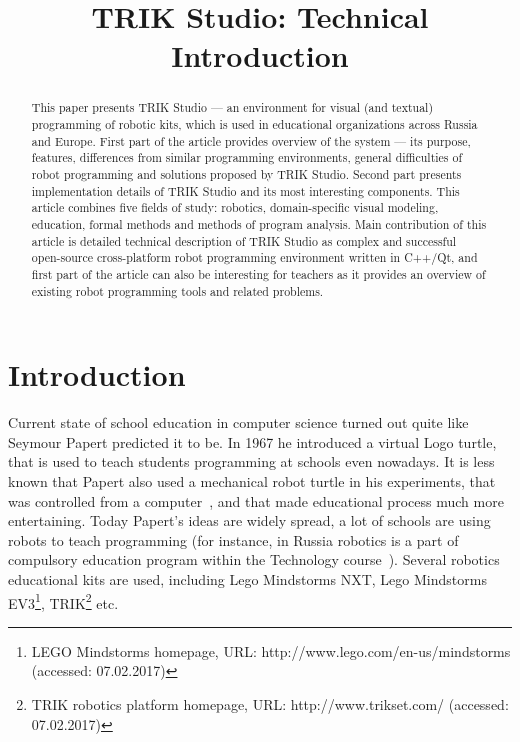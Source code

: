 \documentclass[conference]{IEEEtran}
\begin{document}
\title{TRIK Studio: Technical Introduction}
\date{}%

\author{
\and
\and
}

\maketitle

\begin{abstract}
This paper presents TRIK Studio --- an environment for visual (and textual) programming of robotic kits, which is used in educational organizations across Russia and Europe. First part of the article provides overview of the system --- its purpose, features, differences from similar programming environments, general difficulties of robot programming and solutions proposed by TRIK Studio. Second part presents implementation details of TRIK Studio and its most interesting components. This article combines five fields of study: robotics, domain-specific visual modeling, education, formal methods and methods of program analysis. Main contribution of this article is detailed technical description of TRIK Studio as complex and successful open-source cross-platform robot programming environment written in C++/Qt, and first part of the article can also be interesting for teachers as it provides an overview of existing robot programming tools and related problems.
\end{abstract}

\section{Introduction}
\label{chapter:intro}
Current state of school education in computer science turned out quite like Seymour Papert predicted it to be. In 1967 he introduced a virtual Logo turtle, that is used to teach students programming at schools even nowadays. It is less known that Papert also used a mechanical robot turtle in his experiments, that was controlled from a computer~\cite{papert1980mindstorms}, and that made educational process much more entertaining. Today Papert's ideas are widely spread, a lot of schools are using robots to teach programming (for instance, in Russia robotics is a part of compulsory education program within the Technology course~\cite{лучин2016внедрение}). Several robotics educational kits are used, including Lego Mindstorms NXT, Lego Mindstorms EV3\footnote{LEGO Mindstorms homepage, URL: http://www.lego.com/en-us/mindstorms (accessed: 07.02.2017)}, TRIK\footnote{TRIK robotics platform homepage, URL: http://www.trikset.com/ (accessed: 07.02.2017)} etc.
\end{document}

